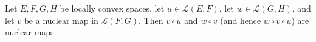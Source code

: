 Let $E, F, G, H$ be locally convex spaces, let $u \in \mathcal{L}(E, F)$, let $w \in \mathcal{L}(G, H)$, and let $v$ be a nuclear map in $\mathcal{L}(F, G)$. Then $v \circ u$ and $w \circ v$ (and hence $w \circ v \circ u$) are nuclear maps.
